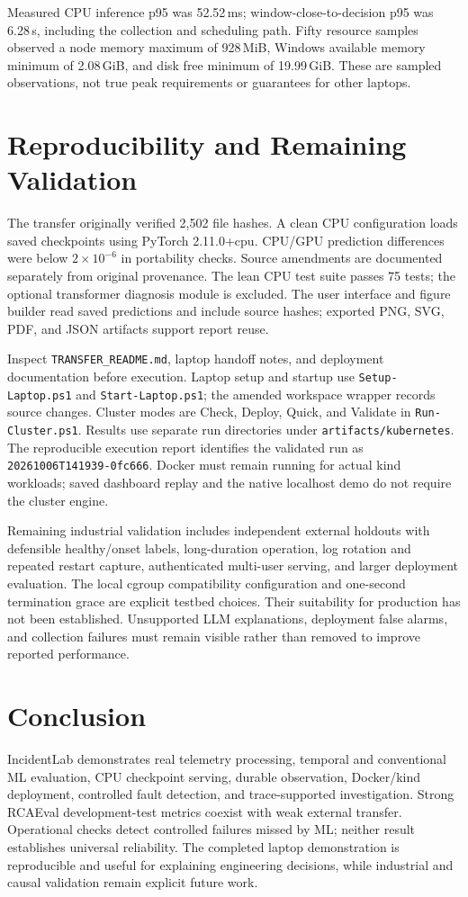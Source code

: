 \documentclass[conference]{IEEEtran}
\begin{document}
Measured CPU inference p95 was 52.52\,ms; window-close-to-decision p95 was 6.28\,s, including the collection and scheduling path. Fifty resource samples observed a node memory maximum of 928\,MiB, Windows available memory minimum of 2.08\,GiB, and disk free minimum of 19.99\,GiB. These are sampled observations, not true peak requirements or guarantees for other laptops.

\section{Reproducibility and Remaining Validation}
The transfer originally verified 2,502 file hashes. A clean CPU configuration loads saved checkpoints using PyTorch 2.11.0+cpu. CPU/GPU prediction differences were below $2\times10^{-6}$ in portability checks. Source amendments are documented separately from original provenance. The lean CPU test suite passes 75 tests; the optional transformer diagnosis module is excluded. The user interface and figure builder read saved predictions and include source hashes; exported PNG, SVG, PDF, and JSON artifacts support report reuse.

Inspect \texttt{TRANSFER\_README.md}, laptop handoff notes, and deployment documentation before execution. Laptop setup and startup use \texttt{Setup-Laptop.ps1} and \texttt{Start-Laptop.ps1}; the amended workspace wrapper records source changes. Cluster modes are Check, Deploy, Quick, and Validate in \texttt{Run-Cluster.ps1}. Results use separate run directories under \texttt{artifacts/kubernetes}. The reproducible execution report identifies the validated run as \texttt{20261006T141939-0fc666}. Docker must remain running for actual kind workloads; saved dashboard replay and the native localhost demo do not require the cluster engine.

Remaining industrial validation includes independent external holdouts with defensible healthy/onset labels, long-duration operation, log rotation and repeated restart capture, authenticated multi-user serving, and larger deployment evaluation. The local cgroup compatibility configuration and one-second termination grace are explicit testbed choices. Their suitability for production has not been established. Unsupported LLM explanations, deployment false alarms, and collection failures must remain visible rather than removed to improve reported performance.

\section{Conclusion}
IncidentLab demonstrates real telemetry processing, temporal and conventional ML evaluation, CPU checkpoint serving, durable observation, Docker/kind deployment, controlled fault detection, and trace-supported investigation. Strong RCAEval development-test metrics coexist with weak external transfer. Operational checks detect controlled failures missed by ML; neither result establishes universal reliability. The completed laptop demonstration is reproducible and useful for explaining engineering decisions, while industrial and causal validation remain explicit future work.
\end{document}
